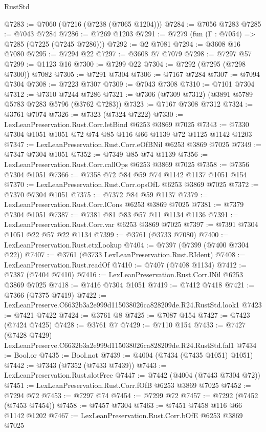 \begin{lexlean}{RustStd}
\begin{coremodule}
@7283 := @7060 (@7216 (@7238 (@7065 @1204)))
@7284 := @7056 @7283
@7285 := @7043 @7284
@7286 := @7269 @1203
@7291 := @7279 (fun (Γ : @7054) => @7285 (@7225 (@7245 @7286)))
@7292 := @2 @7081
@7294 := @3608 @16 @7080
@7295 := @7294 @22
@7297 := @3608 @7 @7079
@7298 := @7297 @57
@7299 := @1123 @16
@7300 := @7299 @22
@7304 := @7292 (@7295 (@7298 @7300)) @7082
@7305 := @7291 @7304
@7306 := @7167 @7284
@7307 := @7094 @7304
@7308 := @7223 @7307
@7309 := @7043 @7308
@7310 := @7101 @7304
@7312 := @7310 @7244 @7286
@7321 := @7306 (@7309 @7312) (@3891 @5789 @5783 @7283 @5796 (@3762 @7283))
@7323 := @7167 @7308 @7312
@7324 := @3761 @7074
@7326 := @7323 (@7324 @7222)
@7330 := LexLeanPreservation.Rust.Corr.letBind @6253 @3869 @7025
@7343 := @7330 @7304 @1051 @1051 @72 @74 @85 @116 @66 @1139 @72 @1125 @1142 @1203
@7347 := LexLeanPreservation.Rust.Corr.eOfBNil @6253 @3869 @7025
@7349 := @7347 @7304 @1051
@7352 := @7349 @85 @74 @1139
@7356 := LexLeanPreservation.Rust.Corr.callOps @6253 @3869 @7025
@7358 := @7356 @7304 @1051
@7366 := @7358 @72 @84 @59 @74 @1142 @1137 @1051 @154
@7370 := LexLeanPreservation.Rust.Corr.opsOfL @6253 @3869 @7025
@7372 := @7370 @7304 @1051
@7375 := @7372 @84 @59 @1137
@7379 := LexLeanPreservation.Rust.Corr.lCons @6253 @3869 @7025
@7381 := @7379 @7304 @1051
@7387 := @7381 @81 @83 @57 @11 @1134 @1136
@7391 := LexLeanPreservation.Rust.Corr.var @6253 @3869 @7025
@7397 := @7391 @7304 @1051 @22 @57 @22 @1134
@7399 := @3761 (@3733 @7080)
@7400 := LexLeanPreservation.Rust.ctxLookup
@7404 := @7397 (@7399 (@7400 @7304 @22))
@7407 := @3761 (@3733 LexLeanPreservation.Rust.RIdent)
@7408 := LexLeanPreservation.Rust.readOf
@7410 := @7407 (@7408 @1134)
@7412 := @7387 (@7404 @7410)
@7416 := LexLeanPreservation.Rust.Corr.lNil @6253 @3869 @7025
@7418 := @7416 @7304 @1051
@7419 := @7412 @7418
@7421 := @7366 (@7375 @7419)
@7422 := LexLeanPreserve.C6632b3a2e999d115038026ca828209de.R24.RustStd.look1
@7423 := @7421 @7422
@7424 := @3761 @8
@7425 := @7087 @154
@7427 := @7423 (@7424 @7425)
@7428 := @3761 @7
@7429 := @7110 @154
@7433 := @7427 (@7428 @7429) LexLeanPreserve.C6632b3a2e999d115038026ca828209de.R24.RustStd.fal1
@7434 := Bool.or
@7435 := Bool.not
@7439 := @4004 (@7434 (@7435 @1051) @1051)
@7442 := @7343 (@7352 (@7433 @7439))
@7443 := LexLeanPreservation.Rust.slotFree
@7447 := @7442 (@4004 (@7443 @7304 @72))
@7451 := LexLeanPreservation.Rust.Corr.fOfB @6253 @3869 @7025
@7452 := @7294 @72
@7453 := @7297 @74
@7454 := @7299 @72
@7457 := @7292 (@7452 (@7453 @7454))
@7458 := @7457 @7304
@7463 := @7451 @7458 @116 @66 @1142 @1202
@7467 := LexLeanPreservation.Rust.Corr.bOfE @6253 @3869 @7025

\end{coremodule}
\end{lexlean}
